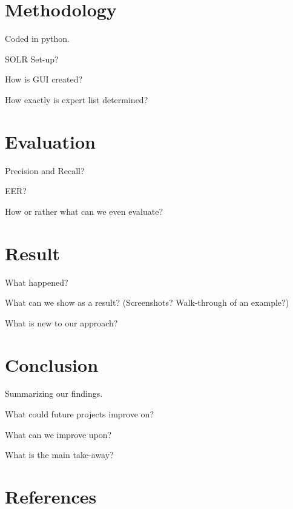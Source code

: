 \documentclass[a4paper,12pt]{article}
\begin{document}
\section{Methodology} %
Coded in python.

SOLR Set-up?

How is GUI created?

How exactly is expert list determined?


\section{Evaluation} %
Precision and Recall?

EER?

How or rather what can we even evaluate?


\section {Result} %
What happened?

What can we show as a result? (Screenshots? Walk-through of an example?)

What is new to our approach?

\section{Conclusion} %
Summarizing our findings.

What could future projects improve on?

What can we improve upon?

What is the main take-away?

\section{References}



\end{document}
